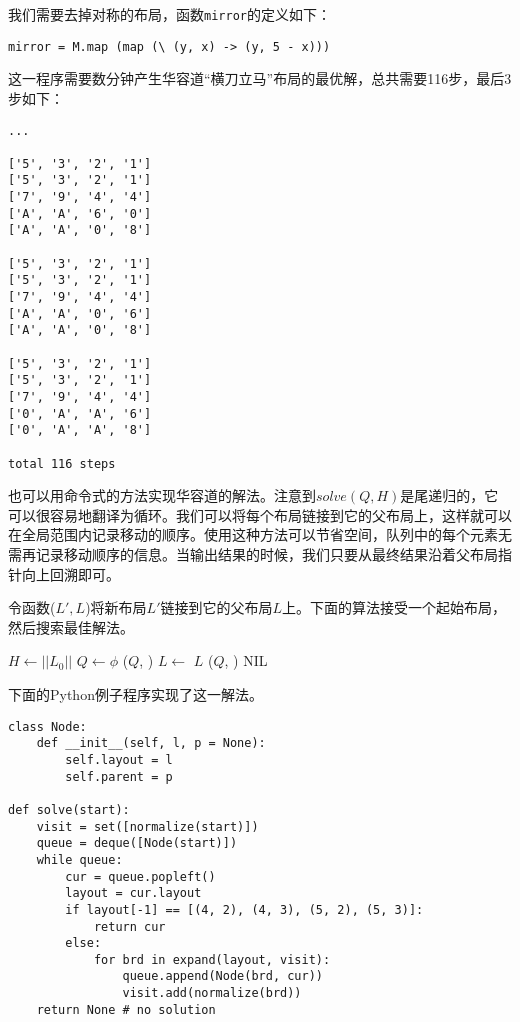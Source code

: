 \documentclass[UTF8]{article}
\begin{document}
我们需要去掉对称的布局，函数\texttt{mirror}的定义如下：

\lstset{language=Haskell}
\begin{lstlisting}
mirror = M.map (map (\ (y, x) -> (y, 5 - x)))
\end{lstlisting}

这一程序需要数分钟产生华容道“横刀立马”布局的最优解，总共需要116步，最后3步如下：

\begin{verbatim}
...

['5', '3', '2', '1']
['5', '3', '2', '1']
['7', '9', '4', '4']
['A', 'A', '6', '0']
['A', 'A', '0', '8']

['5', '3', '2', '1']
['5', '3', '2', '1']
['7', '9', '4', '4']
['A', 'A', '0', '6']
['A', 'A', '0', '8']

['5', '3', '2', '1']
['5', '3', '2', '1']
['7', '9', '4', '4']
['0', 'A', 'A', '6']
['0', 'A', 'A', '8']

total 116 steps
\end{verbatim}

也可以用命令式的方法实现华容道的解法。注意到$solve(Q, H)$是尾递归的，它可以很容易地翻译为循环。我们可以将每个布局链接到它的父布局上，这样就可以在全局范围内记录移动的顺序。使用这种方法可以节省空间，队列中的每个元素无需再记录移动顺序的信息。当输出结果的时候，我们只要从最终结果沿着父布局指针向上回溯即可。

令函数($L', L$)将新布局$L'$链接到它的父布局$L$上。下面的算法接受一个起始布局，然后搜索最佳解法。

\begin{algorithmic}[1]
  \State $H \gets ||L_0||$
  \State $Q \gets \phi$
  \State {}($Q$, )
    \State $L \gets $ 
      \State \Return $L$
    \Else
        \State {}($Q$, )
        \State {}
      \EndFor
    \EndIf
  \EndWhile
  \State \Return NIL 
\EndFunction
\end{algorithmic}

下面的Python例子程序实现了这一解法。

\lstset{language=Python}
\begin{lstlisting}
class Node:
    def __init__(self, l, p = None):
        self.layout = l
        self.parent = p

def solve(start):
    visit = set([normalize(start)])
    queue = deque([Node(start)])
    while queue:
        cur = queue.popleft()
        layout = cur.layout
        if layout[-1] == [(4, 2), (4, 3), (5, 2), (5, 3)]:
            return cur
        else:
            for brd in expand(layout, visit):
                queue.append(Node(brd, cur))
                visit.add(normalize(brd))
    return None # no solution
\end{lstlisting}
\end{document}
